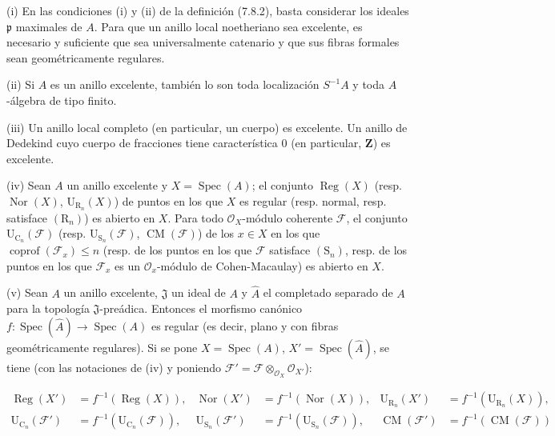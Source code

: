 \begin{scholium}[7.8.3]
\textup{(i)} En las condiciones \textup{(i)} y \textup{(ii)} de la definición \textup{(7.8.2)}, basta considerar
los ideales $\mathfrak p$ maximales de $A$. Para que un anillo \textup{local}
noetheriano sea excelente, es necesario y
suficiente que sea universalmente catenario y que sus fibras formales sean
geométricamente regulares.

\textup{(ii)} Si $A$ es un anillo excelente, también lo son toda localización
$S^{-1}A$ y toda $A$-álgebra de tipo finito.

\textup{(iii)} Un anillo local completo (en particular, un cuerpo) es excelente.
Un anillo de Dedekind cuyo cuerpo de fracciones tiene característica $0$
(en particular, $\mathbf Z$) es excelente.

\textup{(iv)} Sean $A$ un anillo excelente y $X=\operatorname{Spec}(A)$; el conjunto
$\operatorname{Reg}(X)$ \textup{(resp.} $\operatorname{Nor}(X)$,
$\mathrm U_{\mathrm R_n}(X)$) de puntos en los que $X$ es regular \textup{(resp.}
normal, \textup{resp.} satisface $(\mathrm R_n)$) es abierto en $X$. Para todo
$\mathcal O_X$-módulo coherente $\mathcal F$, el conjunto
$\mathrm U_{\mathrm C_n}(\mathcal F)$ \textup{(resp.}
$\mathrm U_{\mathrm S_n}(\mathcal F)$, $\operatorname{CM}(\mathcal F)$) de
los $x\in X$ en los que $\operatorname{coprof}(\mathcal F_x)\leq n$
\textup{(resp.} de los puntos en los que $\mathcal F$ satisface $(\mathrm S_n)$,
\textup{resp.} de los puntos en los que $\mathcal F_x$ es un $\mathcal O_x$-módulo
de Cohen-Macaulay) es abierto en $X$.

\textup{(v)} Sean $A$ un anillo excelente, $\mathfrak J$ un ideal de $A$ y
$\widehat A$ el completado separado de $A$ para la topología
$\mathfrak J$-preádica. Entonces el morfismo canónico
$f:\operatorname{Spec}(\widehat A)\to\operatorname{Spec}(A)$ es regular
\textup{(es decir,} plano \textup{y con fibras} geométricamente regulares). Si se pone
$X=\operatorname{Spec}(A)$, $X'=\operatorname{Spec}(\widehat A)$, se tiene
(con las notaciones de \textup{(iv)} y poniendo
$\mathcal F'=\mathcal F\otimes_{\mathcal O_X}\mathcal O_{X'}$):
\begin{env}[7.8.3.1]
\label{IV.2.s7.8.3.1-fr}
\begin{align*}
\operatorname{Reg}(X')&=f^{-1}(\operatorname{Reg}(X)),&
\operatorname{Nor}(X')&=f^{-1}(\operatorname{Nor}(X)),&
\mathrm U_{\mathrm R_n}(X')&=f^{-1}(\mathrm U_{\mathrm R_n}(X)),\\
\mathrm U_{\mathrm C_n}(\mathcal F')&=f^{-1}(\mathrm U_{\mathrm C_n}(\mathcal F)),&
\mathrm U_{\mathrm S_n}(\mathcal F')&=f^{-1}(\mathrm U_{\mathrm S_n}(\mathcal F)),&
\operatorname{CM}(\mathcal F')&=f^{-1}(\operatorname{CM}(\mathcal F))
\end{align*}
\end{env}


\end{scholium}

